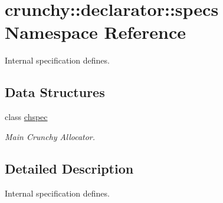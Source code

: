 \hypertarget{namespacecrunchy_1_1declarator_1_1specs}{}\section{crunchy\+:\+:declarator\+:\+:specs Namespace Reference}
\label{namespacecrunchy_1_1declarator_1_1specs}


Internal specification defines.  


\subsection*{Data Structures}
\begin{DoxyCompactItemize}
\item 
class \hyperlink{classcrunchy_1_1declarator_1_1specs_1_1chspec}{chspec}
\begin{DoxyCompactList}\small\item\em Main Crunchy Allocator. \end{DoxyCompactList}\end{DoxyCompactItemize}


\subsection{Detailed Description}
Internal specification defines. 